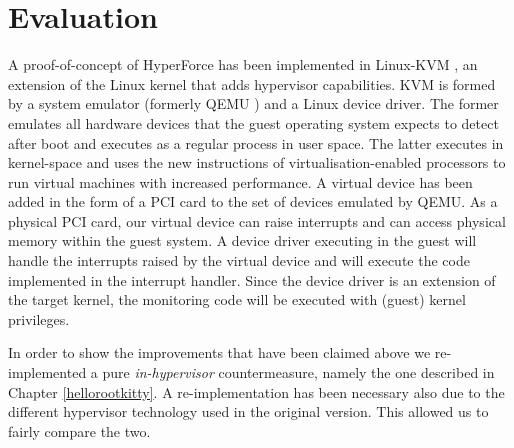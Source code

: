 \section{Evaluation}\label{hf:evaluation}
A proof-of-concept of HyperForce has been implemented in Linux-KVM \cite{kvm}, an extension of the Linux kernel that adds hypervisor capabilities. KVM is formed by a system emulator (formerly QEMU \cite{qemu}) and a Linux device driver.
The former emulates all hardware devices that the guest operating system expects to detect after boot and executes as a regular process in user space. The latter executes in kernel-space and uses the new instructions of virtualisation-enabled processors to run virtual machines with increased performance.
A virtual device has been added in the form of a PCI card to the set of devices emulated by QEMU. As a physical PCI card, our virtual device can raise interrupts and can access physical memory within the guest system. 
A device driver executing in the guest will handle the interrupts raised by the virtual device and will execute the code implemented in the interrupt handler. Since the device driver is an extension of the target kernel, the monitoring code will be executed with (guest) kernel privileges.

In order to show the improvements that have been claimed above we re-implemented a pure \textit{in-hypervisor} countermeasure, namely the one described in Chapter \ref{hellorootkitty}.
A re-implementation has been necessary also due to the different hypervisor technology used in the original version. This allowed us to fairly compare the two.

